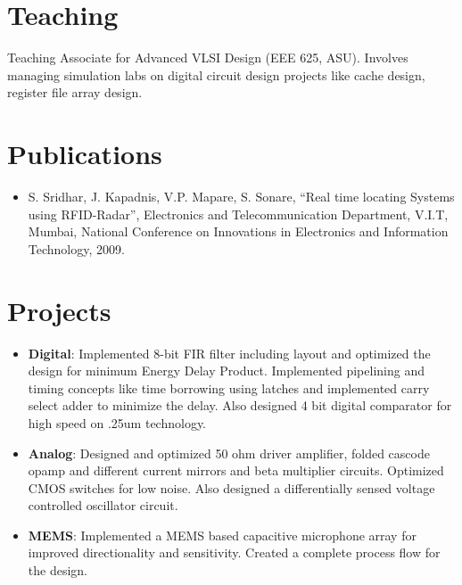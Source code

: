 \documentclass[margin]{res}
\begin{document}
\begin{resume}
\section{Teaching}
Teaching Associate for Advanced VLSI Design (EEE 625, ASU). Involves managing simulation labs on digital circuit design projects like cache design, register file array design.
\section{Publications}
\begin{itemize}
\item
S. Sridhar, J. Kapadnis, V.P. Mapare, S. Sonare, ``Real time locating Systems using RFID-Radar'', Electronics and Telecommunication Department, V.I.T, Mumbai, National Conference on Innovations in Electronics and Information Technology, 2009.
\end{itemize}

\section{Projects}
\begin{itemize}
\item
{\bf Digital}:  Implemented 8-bit FIR filter including layout and optimized the design for minimum Energy Delay Product. Implemented pipelining and timing concepts like time borrowing using latches and implemented carry select adder to minimize the delay. Also designed 4 bit digital comparator for high speed on .25um technology.
\item
{\bf Analog}: Designed and optimized 50 ohm driver amplifier, folded cascode opamp and different current mirrors and beta multiplier circuits. Optimized CMOS switches for low noise. Also designed a differentially sensed voltage controlled oscillator circuit.
\item
{\bf MEMS}: Implemented a MEMS based capacitive microphone array for improved directionality and sensitivity. Created a complete process flow for the design.
\end{itemize}


\end{resume}
\end{document}
